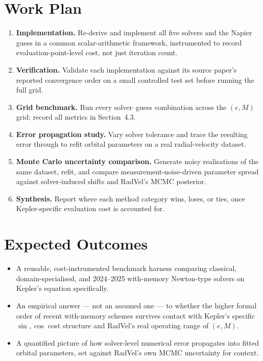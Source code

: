 \documentclass[11pt,a4paper]{article}
\begin{document}
\section{Work Plan}

\begin{enumerate}
  \item \textbf{Implementation.} Re-derive and implement all five solvers
        and the Napier guess in a common scalar-arithmetic framework,
        instrumented to record evaluation-point-level cost, not just
        iteration count.
  \item \textbf{Verification.} Validate each implementation against its
        source paper's reported convergence order on a small controlled
        test set before running the full grid.
  \item \textbf{Grid benchmark.} Run every solver--guess combination
        across the $(e,M)$ grid; record all metrics in
        Section~4.3.
  \item \textbf{Error propagation study.} Vary solver tolerance and trace
        the resulting error through to refit orbital parameters on a real
        radial-velocity dataset.
  \item \textbf{Monte Carlo uncertainty comparison.} Generate noisy
        realisations of the same dataset, refit, and compare
        measurement-noise-driven parameter spread against solver-induced
        shifts and RadVel's MCMC posterior.
  \item \textbf{Synthesis.} Report where each method category wins,
        loses, or ties, once Kepler-specific evaluation cost is
        accounted for.
\end{enumerate}

\section{Expected Outcomes}

\begin{itemize}
  \item A reusable, cost-instrumented benchmark harness comparing
        classical, domain-specialised, and 2024--2025 with-memory
        Newton-type solvers on Kepler's equation specifically.
  \item An empirical answer --- not an assumed one --- to whether the
        higher formal order of recent with-memory schemes survives
        contact with Kepler's specific $\sin,\cos$ cost structure and
        RadVel's real operating range of $(e,M)$.
  \item A quantified picture of how solver-level numerical error
        propagates into fitted orbital parameters, set against RadVel's
        own MCMC uncertainty for context.
\end{itemize}
\end{document}
